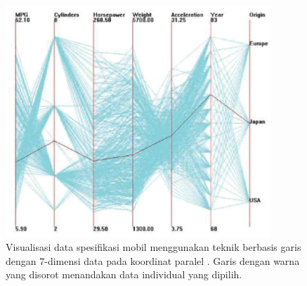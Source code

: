 \begin{figure}[t!]
    \centering
    \includegraphics[width=10cm]{Gambar/datamobil-visual-garis.jpg}
    \caption{Visualisasi data spesifikasi mobil menggunakan teknik berbasis garis dengan 7-dimensi data pada koordinat paralel \cite{buku_visual}. Garis dengan warna yang disorot menandakan data individual yang dipilih.}
    \label{fig:datamobil-visual-garis}
\end{figure}
